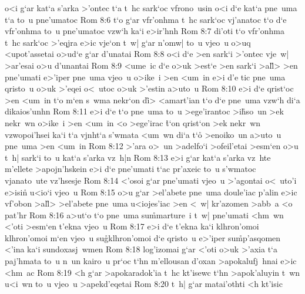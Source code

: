 o<i
g`ar
kat`a
s'arka
>'ontec
t`a
t~hc
sark`oc
vfrono~usin
o<i
d`e
kat`a
pne~uma
t`a
to~u
pne'umatoc\bibvsend
\vs Rom 8:6
t`o
g`ar
vfr'onhma
t~hc
sark`oc
vj'anatoc
t`o
d`e
vfr'onhma
to~u
pne'umatoc
vzw`h
ka`i
e>ir'hnh\bibvsend
\vs Rom 8:7
di'oti
t`o
vfr'onhma
t~hc
sark`oc
>'eqjra
e>ic
vje`on
t~w|
g`ar
n'omw|
to~u
vjeo~u
o>uq
<upot'assetai
o>ud`e
g`ar
d'unatai\bibvsend
\vs Rom 8:8
o<i
d`e
>en
sark`i
>'ontec
vje~w|
>ar'esai
o>u
d'unantai\bibvsend
\vs Rom 8:9
<ume~ic
d`e
o>uk
>est`e
>en
sark`i
>al\r{l}>
>en
pne'umati
e>'iper
pne~uma
vjeo~u
o>ike~i
>en
<um~in
e>i
d'e
tic
pne~uma
qristo~u
o>uk
>'eqei
o<~utoc
o>uk
>'estin
a>uto~u\bibvsend
\vs Rom 8:10
e>i
d`e
qrist`oc
>en
<um~in
t`o
m`en
s~wma
nekr`on
d\r{i}>
<amart'ian
t`o
d`e
pne~uma
vzw`h
di`a
dikaios'unhn\bibvsend
\vs Rom 8:11
e>i
d`e
t`o
pne~uma
to~u
>ege'irantoc
>i\r{h}so~un
>ek
nekr~wn
o>ike~i
>en
<um~in
<o
>ege'irac
\r{t}`on
qrist`on
>ek
nekr~wn
vzwopoi'hsei
ka`i
t`a
vjnht`a
s'wmata
<um~wn
di`a
t`o\r{}
>enoiko~un
a>uto~u
pne~uma
>en
<um~in\bibvsend
\vs Rom 8:12
>'ara
o>~un
>adelfo`i
>ofeil'etai
>esm`en
o>u
t~h|
sark`i
to~u
kat`a
s'arka
vz~h|n\bibvsend
\vs Rom 8:13
e>i
g`ar
kat`a
s'arka
vz~hte
m'ellete
>apojn'hskein
e>i
d`e
pne'umati
t`ac
pr'axeic
to~u
s'wmatoc
vjanato~ute
vz'hsesje\bibvsend
\vs Rom 8:14
<'osoi
g`ar
pne'umati
vjeo~u
>'agontai
o<~uto'i
e>isin\r{}
u<io`i
vjeo~u\bibvsend
\vs Rom 8:15
o>u
g`ar
>el'abete
pne~uma
doule'iac
p'alin
e>ic
vf'obon
>al\r{l}>
>el'abete
pne~uma
u<iojes'iac
>en
<~w|
kr'azomen
>abb~a
<o
pat'hr\bibvsend
\vs Rom 8:16
a>ut`o
t`o
pne~uma
su\r{m}marture~i
t~w|
pne'umati
<hm~wn
<'oti
>esm`en
t'ekna
vjeo~u\bibvsend
\vs Rom 8:17
e>i
d`e
t'ekna
ka`i
klhron'omoi
klhron'omoi
m`en
vjeo~u
su\r{g}klhron'omoi
d`e
qristo~u
e>'iper
su\r{m}p'asqomen
<'ina
ka`i
sundoxasj~wmen\bibvsend
\vs Rom 8:18
log'izomai
g`ar
<'oti
o>uk
>'axia
t`a
paj'hmata
to~u
n~un
kairo~u
pr`oc
t`hn
m'ellousan
d'oxan
>apokalufj~hnai
e>ic
<hm~ac\bibvsend
\vs Rom 8:19
<h
g`ar
>apokaradok'ia
t~hc
kt'isewc
t`hn
>apok'aluyin
t~wn
u<i~wn
to~u
vjeo~u
>apekd'eqetai\bibvsend
\vs Rom 8:20
t~h|
g`ar
matai'othti
<h
kt'isic
